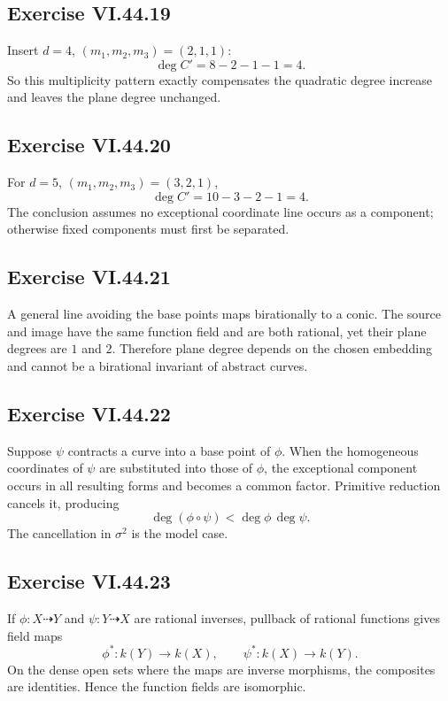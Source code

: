 \subsection*{Exercise VI.44.19}
\begin{solution}
Insert \(d=4\), \((m_1,m_2,m_3)=(2,1,1)\):
\[
\deg C'=8-2-1-1=4.
\]
So this multiplicity pattern exactly compensates the quadratic degree increase and leaves the plane degree unchanged.
\end{solution}

\subsection*{Exercise VI.44.20}
\begin{solution}
For \(d=5\), \((m_1,m_2,m_3)=(3,2,1)\),
\[
\deg C'=10-3-2-1=4.
\]
The conclusion assumes no exceptional coordinate line occurs as a component; otherwise fixed components must first be separated.
\end{solution}

\subsection*{Exercise VI.44.21}
\begin{solution}
A general line avoiding the base points maps birationally to a conic.  The source and image have the same function field and are both rational, yet their plane degrees are \(1\) and \(2\).  Therefore plane degree depends on the chosen embedding and cannot be a birational invariant of abstract curves.
\end{solution}

\subsection*{Exercise VI.44.22}
\begin{solution}
Suppose \(\psi\) contracts a curve into a base point of \(\phi\).  When the homogeneous coordinates of \(\psi\) are substituted into those of \(\phi\), the exceptional component occurs in all resulting forms and becomes a common factor.  Primitive reduction cancels it, producing
\[
\deg(\phi\circ\psi)<\deg\phi\,\deg\psi.
\]
The cancellation in \(\sigma^2\) is the model case.
\end{solution}

\subsection*{Exercise VI.44.23}
\begin{solution}
If \(\phi:X\dashrightarrow Y\) and \(\psi:Y\dashrightarrow X\) are rational inverses, pullback of rational functions gives field maps
\[
\phi^*:k(Y)\to k(X),\qquad \psi^*:k(X)\to k(Y).
\]
On the dense open sets where the maps are inverse morphisms, the composites are identities.  Hence the function fields are isomorphic.
\end{solution}

